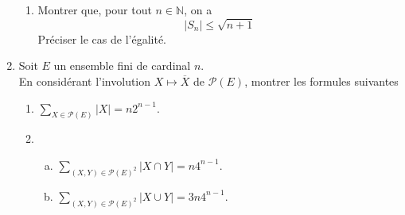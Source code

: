 \documentclass[7pt, twocolumn]{extarticle}
\def\N{\mathbb N}
\def\P{\mathscr{P}}
\begin{document}
\begin{enumerate}[start=4,label={\bfseries \arabic*}]
\begin{enumerate}[start=1, label={\bfseries \arabic*.}]
			\item Montrer que, pour tout $n\in\N$, on a \[|S_n|\leq \sqrt{n+1}\]
			Préciser le cas de l'égalité.
		\end{enumerate}
		\item Soit $E$ un ensemble fini de cardinal $n$.\\
		En considérant l'involution $X\mapsto \overline{X}$ de $\mathscr{P}(E)$, montrer les formules suivantes
		\begin{enumerate}[start=1, label={\bfseries \arabic*.}]
			\item \(\sum_{X\in\mathscr{P}(E)}|X|=n2^{n-1}\).
			\item
			\begin{enumerate}[(a)]
				\item \(\sum_{(X,Y)\in\P(E)^2}|X\cap Y|=n4^{n-1}\).
				\item \(\sum_{(X,Y)\in\P(E)^2}|X\cup Y|=3n4^{n-1}\).
			\end{enumerate}
		\end{enumerate}
	\end{enumerate}
\end{document}
